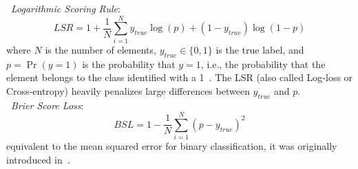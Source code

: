 \documentclass[draft]{aa}
\begin{document}


 \noindent \textbullet\ \emph{Logarithmic Scoring Rule}:
 \begin{equation}
 LSR = 1+\frac{1}{N} \sum_{i=1}^N y_{true} \log(p) + (1-y_{true}) \log(1-p)
 \end{equation}
 \noindent where $N$ is the number of elements, $y_{true}\in\{0,1\}$ is the
 true label, and $p{=}\operatorname{Pr}(y{=}1)$ is the probability that
 $y{=}1$, i.e., the probability that the element belongs to the class
 identified with a 1~\citep{Good_1952}. The LSR (also called Log-loss or
 Cross-entropy) heavily penalizes large differences between $y_{true}$ and
 $p$.\\

 \noindent \textbullet\ \emph{Brier Score Loss}:
 \begin{equation}
 BSL = 1-\frac{1}{N} \sum_{i=1}^N (p-y_{true})^2
 \end{equation}
 \noindent equivalent to the mean squared error for binary classification,
 it was originally introduced in~\cite{Brier_1950}.\\
\end{document}
